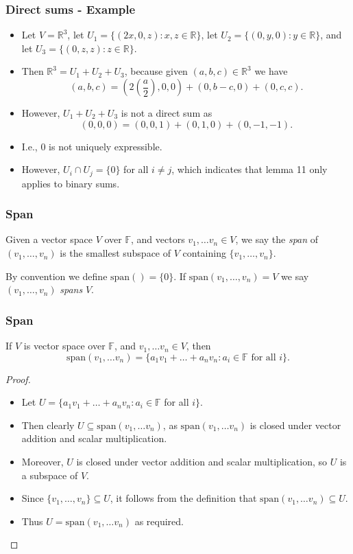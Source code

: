 \documentclass[handout]{beamer}
\newcommand{\bR}{\mathbb{R}}
\newcommand{\bF}{\mathbb{F}}
\newcommand{\spa}{\mathrm{span}}
\begin{document}
\begin{frame}
\frametitle{Direct sums - Example}
\begin{itemize}
\item Let $V = \bR^3$, let $U_1 = \{(2x, 0, z): x,z\in \bR\}$, let $U_2 = \{(0,y,0): y\in \bR\}$, and let $U_3 = \{(0,z,z): z\in\bR\}$. 
\item Then $\bR^3 = U_1 + U_2 + U_3$, because given $(a,b,c)\in\bR^3$ we have 
\[(a,b,c) = (2(\frac{a}{2}), 0, 0) + (0, b-c, 0) + (0,c,c).\]

\item However, $U_1+U_2+U_3$ is not a direct sum as 
\[(0,0,0) = (0,0,1) + (0,1,0) + (0,-1,-1).\] 
\item I.e., $0$ is not uniquely expressible.

\item However, $U_i\cap U_j = \{0\}$ for all $i\neq j$, which indicates that lemma 11 only applies to binary sums.
\end{itemize}
\end{frame}

\begin{frame}
\frametitle{Span}
\begin{definition}
Given a vector space $V$ over $\bF$, and vectors $v_1,\ldots v_n\in V$, we say the \emph{span} of $(v_1,\ldots,v_n)$ is the smallest subspace of $V$ containing $\{v_1,\ldots,v_n\}$. 

By convention we define $\spa() = \{0\}$. If $\spa(v_1,\ldots,v_n) = V$ we say $(v_1,\ldots,v_n)$ \emph{spans} $V$.
\end{definition}

\end{frame}

\begin{frame}
\frametitle{Span}
\begin{lemma}
If $V$ is vector space over $\bF$, and $v_1,\ldots v_n\in V$, then 
\[\spa(v_1,\ldots v_n) = \{a_1v_1+\ldots + a_nv_n: a_i \in \bF\text{ for all }i\}.\]
\end{lemma}
\begin{proof}
\begin{itemize}
\item Let $U = \{a_1v_1+\ldots + a_nv_n: a_i \in \bF$ for all $i\}$. 
\item Then clearly $U\subseteq \spa(v_1,\ldots v_n)$, as $\spa(v_1,\ldots v_n)$ is closed under vector addition and scalar multiplication. 
\item Moreover, $U$ is closed under vector addition and scalar multiplication, so $U$ is a subspace of $V$. 
\item Since $\{v_1,\ldots,v_n\}\subseteq U$, it follows from the definition that $\spa(v_1,\ldots v_n)\subseteq U$. 
\item Thus $U = \spa(v_1,\ldots v_n)$ as required. 
\end{itemize} 
\end{proof}
\end{frame}
\end{document}
